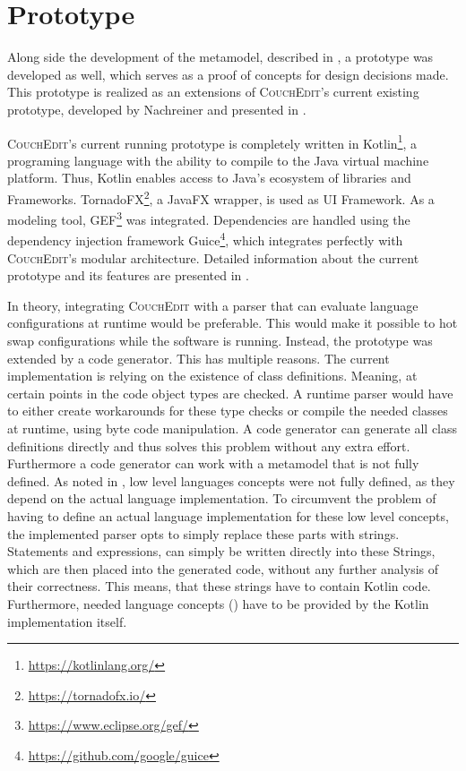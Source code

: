 \chapter{Prototype}
\label{ch:prototype}
Along side the development of the metamodel, described in , a prototype was developed as well, which serves as a proof of concepts for design decisions made. This prototype is realized as an extensions of \textsc{CouchEdit}'s current existing prototype, developed by Nachreiner and presented in \cite{nachreiner_couchedit_2020}.

\textsc{CouchEdit}'s current running prototype is completely written in Kotlin\footnote{\url{https://kotlinlang.org/}}, a programing language with the ability to compile to the Java virtual machine platform. Thus, Kotlin enables access to Java's ecosystem of libraries and Frameworks. TornadoFX\footnote{\url{https://tornadofx.io/}}, a JavaFX wrapper, is used as UI Framework. As a modeling tool, GEF\footnote{\url{https://www.eclipse.org/gef/}} was integrated. Dependencies are handled using the dependency injection framework Guice\footnote{\url{https://github.com/google/guice}}, which integrates perfectly with \textsc{CouchEdit}'s modular architecture. Detailed information about the current prototype and its features are presented in \cite{nachreiner_couchedit_2020}.

In theory, integrating \textsc{CouchEdit} with a parser that can evaluate language configurations at runtime would be preferable. This would make it possible to hot swap configurations while the software is running. Instead, the prototype was extended by a code generator. This has multiple reasons. The current implementation is relying on the existence of class definitions. Meaning, at certain points in the code object types are checked. A runtime parser would have to either create workarounds for these type checks or compile the needed classes at runtime, using byte code manipulation. A code generator can generate all class definitions directly and thus solves this problem without any extra effort. Furthermore a code generator can work with a metamodel that is not fully defined. As noted in , low level languages concepts were not fully defined, as they depend on the actual language implementation. To circumvent the problem of having to define an actual language implementation for these low level concepts, the implemented parser opts to simply replace these parts with strings. Statements and expressions, can simply be written directly into these Strings, which are then placed into the generated code, without any further analysis of their correctness. This means, that these strings have to contain Kotlin code. Furthermore, needed language concepts () have to be provided by the Kotlin implementation itself.

